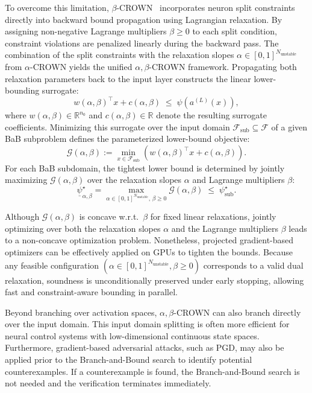 To overcome this limitation, $\beta$-CROWN~\cite{wang2021beta} incorporates neuron split constraints directly into 
backward bound propagation using Lagrangian relaxation. By assigning non-negative Lagrange multipliers $\beta \ge 0$ 
to each split condition, constraint violations are penalized linearly during the backward pass.
The combination of the split constraints with the relaxation slopes $\alpha \in [0, 1]^{N_{\mathrm{unstable}}}$ from $\alpha$-CROWN 
yields the unified $\alpha,\beta$-CROWN framework. Propagating both relaxation parameters back to the input layer constructs 
the linear lower-bounding surrogate:
\begin{equation}
    w(\alpha, \beta)^\top x + c(\alpha, \beta) \;\le\; \psi(a^{(L)}(x)),
\end{equation}
where $w(\alpha, \beta) \in \mathbb{R}^{n_0}$ and $c(\alpha, \beta) \in \mathbb{R}$ denote the resulting surrogate coefficients. 
Minimizing this surrogate over the input domain $\mathcal{F}_{\mathrm{sub}} \subseteq \mathcal{F}$ of a given BaB subproblem 
defines the parameterized lower-bound objective:
\begin{equation}
    \mathcal{G}(\alpha, \beta) := \min_{x \in \mathcal{F}_{\mathrm{sub}}} \left( w(\alpha, \beta)^\top x + c(\alpha, \beta) \right).
    \label{eq:beta-g-def}
\end{equation}
For each BaB subdomain, the tightest lower bound is determined by jointly maximizing $\mathcal{G}(\alpha, \beta)$ 
over the relaxation slopes $\alpha$ and Lagrange multipliers $\beta$:
\begin{equation}
    \label{eq:beta-crown-opt}
    \underline{\psi}^\star_{\alpha,\beta} = \max_{\alpha \in [0, 1]^{N_{\mathrm{unstable}}}, \, \beta \ge 0} \mathcal{G}(\alpha, \beta) \;\le\; \psi^\star_{\mathrm{sub}}.
\end{equation}

Although $\mathcal{G}(\alpha, \beta)$ is concave w.r.t.\ $\beta$ for fixed linear relaxations, 
jointly optimizing over both the relaxation slopes $\alpha$ and the Lagrange multipliers $\beta$ leads to a non-concave optimization problem. 
Nonetheless, projected gradient-based optimizers can be effectively applied on GPUs to tighten the bounds. 
Because any feasible configuration $\left( \alpha \in [0, 1]^{N_{\mathrm{unstable}}}, \beta \ge 0 \right)$ corresponds to a valid dual relaxation, 
soundness is unconditionally preserved under early stopping, allowing fast and constraint-aware bounding in parallel.

Beyond branching over activation spaces, $\alpha,\beta$-CROWN can also branch directly over the input domain.
This input domain splitting is often more efficient for neural control systems with low-dimensional continuous state spaces. 
Furthermore, gradient-based adversarial attacks, such as PGD, may also be applied prior to the Branch-and-Bound search to identify potential 
counterexamples. If a counterexample is found, the Branch-and-Bound search is not needed and the verification terminates immediately. 

